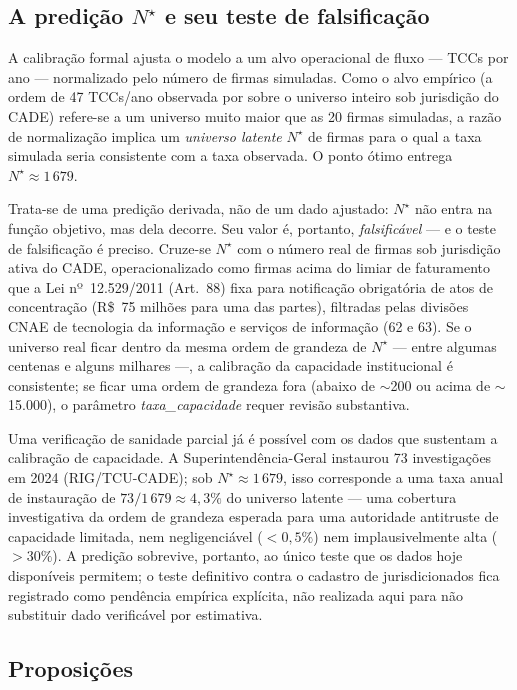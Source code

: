 \documentclass[12pt,a4paper]{article}
\begin{document}
\subsection{A predição \texorpdfstring{$N^\star$}{N*} e seu teste de falsificação}
\label{sec:nstar}

A calibração formal ajusta o modelo a um alvo operacional de fluxo --- TCCs
por ano --- normalizado pelo número de firmas simuladas. Como o alvo empírico
(a ordem de 47 TCCs/ano observada por \citet{saito2021tcc} sobre o universo
inteiro sob jurisdição do CADE) refere-se a um universo muito maior que as
20 firmas simuladas, a razão de normalização implica um \emph{universo latente}
$N^\star$ de firmas para o qual a taxa simulada seria consistente com a taxa
observada. O ponto ótimo entrega $N^\star \approx 1\,679$.

Trata-se de uma predição derivada, não de um dado ajustado: $N^\star$ não
entra na função objetivo, mas dela decorre. Seu valor é, portanto,
\emph{falsificável} --- e o teste de falsificação é preciso. Cruze-se
$N^\star$ com o número real de firmas sob jurisdição ativa do CADE,
operacionalizado como firmas acima do limiar de faturamento que a Lei
nº~12.529/2011 (Art.~88) fixa para notificação obrigatória de atos de
concentração (R\$~75 milhões para uma das partes), filtradas pelas divisões
CNAE de tecnologia da informação e serviços de informação (62 e 63). Se o
universo real ficar dentro da mesma ordem de grandeza de $N^\star$ --- entre
algumas centenas e alguns milhares ---, a calibração da capacidade
institucional é consistente; se ficar uma ordem de grandeza fora (abaixo de
$\sim$200 ou acima de $\sim$15.000), o parâmetro \emph{taxa\_capacidade}
requer revisão substantiva.

Uma verificação de sanidade parcial já é possível com os dados que
sustentam a calibração de capacidade. A Superintendência-Geral instaurou 73
investigações em 2024 (RIG/TCU-CADE); sob $N^\star \approx 1\,679$, isso
corresponde a uma taxa anual de instauração de $73/1\,679 \approx 4{,}3\%$ do
universo latente --- uma cobertura investigativa da ordem de grandeza
esperada para uma autoridade antitruste de capacidade limitada, nem
negligenciável ($<0{,}5\%$) nem implausivelmente alta ($>30\%$). A predição
sobrevive, portanto, ao único teste que os dados hoje disponíveis permitem;
o teste definitivo contra o cadastro de jurisdicionados fica registrado como
pendência empírica explícita, não realizada aqui para não substituir dado
verificável por estimativa.

\subsection{Proposições}
\end{document}

